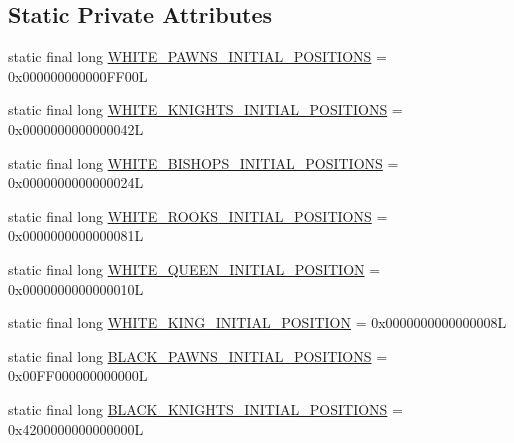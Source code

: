 \subsection*{Static Private Attributes}
\begin{DoxyCompactItemize}
\item 
static final long \mbox{\hyperlink{classcom_1_1chess_1_1engine_1_1bitboards_1_1_bit_board_v2_aa98eaa9b05dc54e5d988a102771fd1f0}{W\+H\+I\+T\+E\+\_\+\+P\+A\+W\+N\+S\+\_\+\+I\+N\+I\+T\+I\+A\+L\+\_\+\+P\+O\+S\+I\+T\+I\+O\+NS}} = 0x000000000000\+F\+F00L
\item 
static final long \mbox{\hyperlink{classcom_1_1chess_1_1engine_1_1bitboards_1_1_bit_board_v2_aa84a5d2a712dd74a99336fe99f2a921b}{W\+H\+I\+T\+E\+\_\+\+K\+N\+I\+G\+H\+T\+S\+\_\+\+I\+N\+I\+T\+I\+A\+L\+\_\+\+P\+O\+S\+I\+T\+I\+O\+NS}} = 0x0000000000000042L
\item 
static final long \mbox{\hyperlink{classcom_1_1chess_1_1engine_1_1bitboards_1_1_bit_board_v2_ac87392c3378c0ce026f7a56a4e9606ee}{W\+H\+I\+T\+E\+\_\+\+B\+I\+S\+H\+O\+P\+S\+\_\+\+I\+N\+I\+T\+I\+A\+L\+\_\+\+P\+O\+S\+I\+T\+I\+O\+NS}} = 0x0000000000000024L
\item 
static final long \mbox{\hyperlink{classcom_1_1chess_1_1engine_1_1bitboards_1_1_bit_board_v2_a31e0c1022c01db20b6499a1ca9d0cc70}{W\+H\+I\+T\+E\+\_\+\+R\+O\+O\+K\+S\+\_\+\+I\+N\+I\+T\+I\+A\+L\+\_\+\+P\+O\+S\+I\+T\+I\+O\+NS}} = 0x0000000000000081L
\item 
static final long \mbox{\hyperlink{classcom_1_1chess_1_1engine_1_1bitboards_1_1_bit_board_v2_afd6ca3d1a2ef57d971bc0dc0f158d6a9}{W\+H\+I\+T\+E\+\_\+\+Q\+U\+E\+E\+N\+\_\+\+I\+N\+I\+T\+I\+A\+L\+\_\+\+P\+O\+S\+I\+T\+I\+ON}} = 0x0000000000000010L
\item 
static final long \mbox{\hyperlink{classcom_1_1chess_1_1engine_1_1bitboards_1_1_bit_board_v2_a1a7015875e31a2b720814fd41eb7b7d3}{W\+H\+I\+T\+E\+\_\+\+K\+I\+N\+G\+\_\+\+I\+N\+I\+T\+I\+A\+L\+\_\+\+P\+O\+S\+I\+T\+I\+ON}} = 0x0000000000000008L
\item 
static final long \mbox{\hyperlink{classcom_1_1chess_1_1engine_1_1bitboards_1_1_bit_board_v2_ad59f8b82a4feb156b3bcc0bce889a15b}{B\+L\+A\+C\+K\+\_\+\+P\+A\+W\+N\+S\+\_\+\+I\+N\+I\+T\+I\+A\+L\+\_\+\+P\+O\+S\+I\+T\+I\+O\+NS}} = 0x00\+F\+F000000000000L
\item 
static final long \mbox{\hyperlink{classcom_1_1chess_1_1engine_1_1bitboards_1_1_bit_board_v2_a485a09c4952ad1b4f926283322c94bca}{B\+L\+A\+C\+K\+\_\+\+K\+N\+I\+G\+H\+T\+S\+\_\+\+I\+N\+I\+T\+I\+A\+L\+\_\+\+P\+O\+S\+I\+T\+I\+O\+NS}} = 0x4200000000000000L

\end{DoxyCompactItemize}
